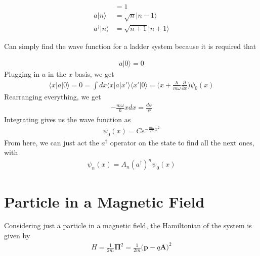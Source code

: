 \begin{align}
[a,a^\dagger] &= 1 \\
a|n\rangle &= \sqrt{n}|n-1\rangle\\
a^\dagger|n\rangle &= \sqrt{n+1}|n+1\rangle
\end{align}


Can simply find the wave function for a ladder system because it is required that

\begin{align}
a|0\rangle= 0
\end{align}
Plugging in $a$ in the $x$ basis, we get
\begin{align}
\langle x|a|0\rangle = 0 = \int dx \langle x|a|x'\rangle\langle x'|0\rangle = \Big(x + \frac{\hbar}{m\omega}\frac{\partial}{\partial x}\Big)\psi_0(x)
\end{align}
Rearranging everything, we get
\begin{align}\label{harmosc}
-\frac{m\omega}{\hbar}xdx = \frac{d\psi}{\psi}
\end{align}
Integrating gives us the wave function as
\begin{align}
\psi_0(x) = Ce^{-\frac{m\omega}{2\hbar}x^2}
\end{align}
From here, we can just act the $a^\dagger$ operator on the state to find all the next ones, with
\begin{align}
\psi_n(x) = A_n(a^\dagger)^n\psi_0(x)
\end{align}





\section{Particle in a Magnetic Field}
Considering just a particle in a magnetic field, the Hamiltonian of the system is given by\cite{lecture5}
\begin{align}
H = \frac{1}{2m}\boldsymbol{\Pi}^2 = \frac{1}{2m}\Big(\textbf{p}-q\textbf{A}\Big)^2
\end{align}

